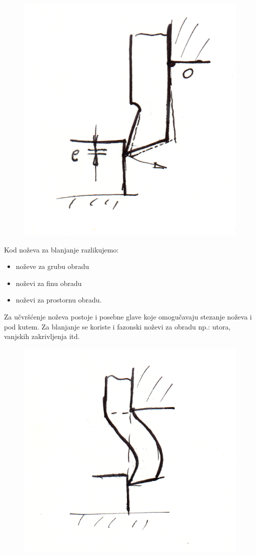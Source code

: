 \documentclass[a4paper,12pt]{article}
\numberwithin{figure}{section}
\begin{document}
\begin{figure}[!h]
\centering
\includegraphics[scale=0.15]{image_16-2.png}
\end{figure}
\FloatBarrier
Kod noževa za blanjanje razlikujemo:
\begin{itemize}
\item noževe za grubu obradu
\item noževi za finu obradu
\item noževi za prostornu obradu.
\end{itemize}
Za učvršćenje noževa postoje i posebne glave koje omogučavaju stezanje noževa i pod kutem. Za blanjanje se koriste i fazonski noževi za obradu np.: utora, vanjskih zakrivljenja itd.
\begin{figure}[!h]
\centering
\includegraphics[scale=0.15]{image_16-3.png}
\end{figure}
\end{document}
